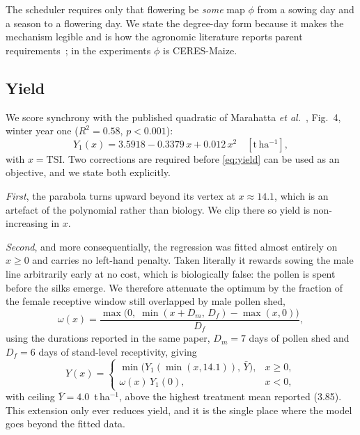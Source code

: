 \documentclass[10pt,twocolumn]{article}
\newcommand{\TSI}{\mathrm{TSI}}
\begin{document}
The scheduler requires only that flowering be \emph{some} map $\phi$ from a
sowing day and a season to a flowering day. We state the degree-day form
because it makes the mechanism legible and is how the agronomic literature
reports parent requirements~\cite{marahatta2025,chassaigne2021}; in the
experiments $\phi$ is CERES-Maize.

\subsection{Yield}

We score synchrony with the published quadratic of Marahatta
\textit{et al.}~\cite{marahatta2025}, Fig.~4, winter year one
($R^2 = 0.58$, $p < 0.001$):
\begin{equation}
Y_1(x) = 3.5918 - 0.3379\,x + 0.012\,x^2 \quad [\mathrm{t\,ha^{-1}}],
\label{eq:yield}
\end{equation}
with $x = \TSI$. Two corrections are required before
\eqref{eq:yield} can be used as an objective, and we state both explicitly.

\emph{First}, the parabola turns upward beyond its vertex at $x \approx 14.1$,
which is an artefact of the polynomial rather than biology. We clip there so
yield is non-increasing in $x$.

\emph{Second}, and more consequentially, the regression was fitted almost
entirely on $x \ge 0$ and carries no left-hand penalty. Taken literally it
rewards sowing the male line arbitrarily early at no cost, which is
biologically false: the pollen is spent before the silks emerge. We therefore
attenuate the optimum by the fraction of the female receptive window still
overlapped by male pollen shed,
\begin{equation}
\omega(x) = \frac{\max\!\big(0,\; \min(x + D_m,\, D_f) - \max(x,0)\big)}{D_f},
\end{equation}
using the durations reported in the same paper, $D_m = 7$ days of pollen shed
and $D_f = 6$ days of stand-level receptivity, giving
\begin{equation}
Y(x) =
\begin{cases}
\min\!\big(Y_1(\min(x,14.1)),\, \bar{Y}\big), & x \ge 0,\\[2pt]
\omega(x)\,Y_1(0), & x < 0,
\end{cases}
\end{equation}
with ceiling $\bar{Y} = 4.0$~t\,ha$^{-1}$, above the highest treatment mean
reported (3.85). This extension only ever reduces yield, and it is the single
place where the model goes beyond the fitted data.
\end{document}

